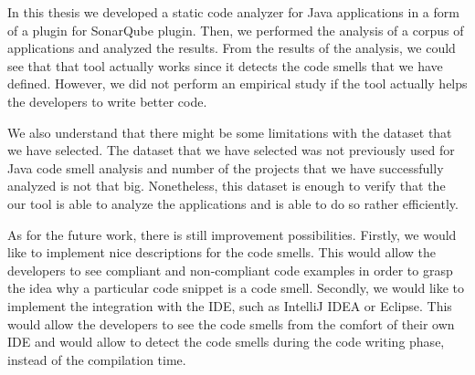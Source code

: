 
In this thesis we developed a static code analyzer for Java applications in a form
of a plugin for SonarQube plugin.
Then, we performed the analysis of a corpus of applications and analyzed the results.
From the results of the analysis, we could see that that tool actually works since it
detects the code smells that we have defined.
However, we did not perform an empirical study if the tool actually helps the developers to
write better code.

We also understand that there might be some limitations with the dataset that we have selected.
The dataset that we have selected was not previously used for Java code smell analysis and number of the
projects that we have successfully analyzed is not that big.
Nonetheless, this dataset is enough to verify that the our tool is able to analyze the applications and is able
to do so rather efficiently.

As for the future work, there is still improvement possibilities.
Firstly, we would like to implement nice descriptions for the code smells.
This would allow the developers to see compliant and non-compliant code examples in order to grasp
the idea why a particular code snippet is a code smell.
Secondly, we would like to implement the integration with the IDE, such as IntelliJ IDEA or Eclipse.
This would allow the developers to see the code smells from the comfort of their own IDE and would allow
to detect the code smells during the code writing phase, instead of the compilation time.
